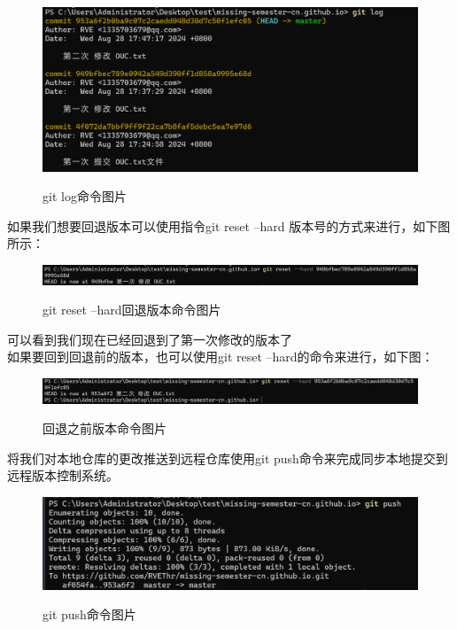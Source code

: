 \documentclass[
    report,     %
    oneside,    %
    UTF8,       %
    zihao=-4    %
]{config} %
\begin{document}
\begin{figure}[H] %
    \centering %
    \includegraphics[width=0.9\linewidth]{image10.png}
    \caption*{git log命令图片} %
    \caption{} %
    \label{fig:example1} %
\end{figure}
\vspace{-0.7em}  %

如果我们想要回退版本可以使用指令git reset --hard 版本号的方式来进行，如下图所示：

\begin{figure}[H] %
    \centering %
    \includegraphics[width=0.9\linewidth]{image11.png}
    \caption*{git reset --hard回退版本命令图片} %
    \caption{} %
    \label{fig:example1} %
\end{figure}
\vspace{-0.7em}  %


可以看到我们现在已经回退到了第一次修改的版本了\\
如果要回到回退前的版本，也可以使用git reset --hard的命令来进行，如下图：

\begin{figure}[H] %
    \centering %
    \includegraphics[width=0.5\linewidth]{image12.png}
    \caption*{回退之前版本命令图片} %
    \caption{} %
    \label{fig:example1} %
\end{figure}
\vspace{-0.7em}  %

将我们对本地仓库的更改推送到远程仓库使用git push命令来完成同步本地提交到远程版本控制系统。

\begin{figure}[H] %
    \centering %
    \includegraphics[width=0.9\linewidth]{image13.png}
    \caption*{git push命令图片} %
    \caption{} %
    \label{fig:example1} %
\end{figure}
\vspace{-0.7em}  %
\end{document}
